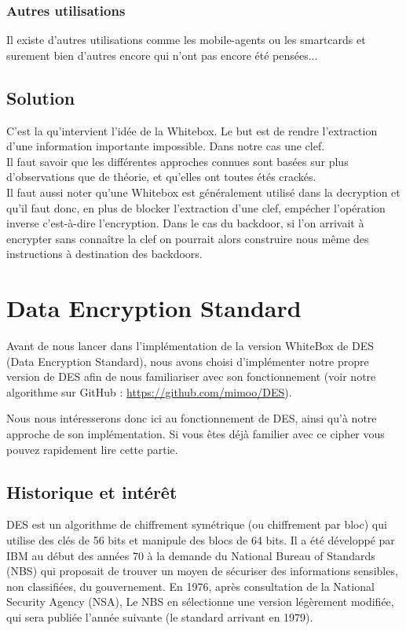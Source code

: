 \documentclass[a4paper,12pt]{article}
\begin{document}
\subsubsection{Autres utilisations}

Il existe d'autres utilisations comme les mobile-agents ou les smartcards et surement bien d'autres encore qui n'ont pas encore été pensées...


\subsection{Solution}

C'est la qu'intervient l'idée de la Whitebox. Le but est de rendre l'extraction d'une information importante impossible. Dans notre cas une clef.\\
Il faut savoir que les différentes approches connues sont basées sur plus d'observations que de théorie, et qu'elles ont toutes étés crackés.\\
Il faut aussi noter qu'une Whitebox est généralement utilisé dans la decryption et qu'il faut donc, en plus de blocker l'extraction d'une clef, empécher l'opération inverse c'est-à-dire l'encryption. Dans le cas du backdoor, si l'on arrivait à encrypter sans connaître la clef on pourrait alors construire nous même des instructions à destination des backdoors.\\

\newpage
	
\section{Data Encryption Standard}

Avant de nous lancer dans l'implémentation de la version WhiteBox de DES (Data Encryption Standard), nous avons choisi d'implémenter notre propre version de DES afin de nous familiariser avec son fonctionnement (voir notre algorithme sur GitHub : \url{https://github.com/mimoo/DES}).
	
Nous nous intéresserons donc ici au fonctionnement de DES, ainsi qu'à notre approche de son implémentation. Si vous êtes déjà familier avec ce cipher vous pouvez rapidement lire cette partie.

\subsection{Historique et intérêt}

DES est un algorithme de chiffrement symétrique (ou chiffrement par bloc) qui utilise des clés de 56 bits et manipule des blocs de 64 bits. Il a été développé par IBM au début des années 70 à la demande du National Bureau of Standards (NBS) qui proposait de trouver un moyen de sécuriser des informations sensibles, non classifiées, du gouvernement. En 1976, après consultation de la National Security Agency (NSA), Le NBS en sélectionne une version légèrement modifiée, qui sera publiée l'année suivante (le standard arrivant en 1979).
\end{document}
